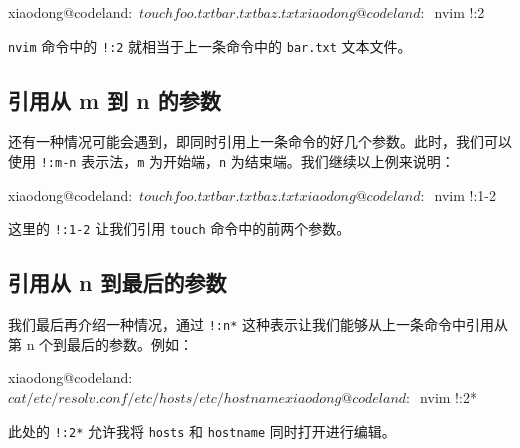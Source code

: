 \documentclass[]{ctexbook}
\newenvironment{Shaded}{\begin{snugshade}}{\end{snugshade}}
\newcommand{\ExtensionTok}[1]{#1}
\newcommand{\NormalTok}[1]{#1}
\begin{document}
\begin{Shaded}
\begin{Highlighting}[]
\ExtensionTok{xiaodong@codeland}\NormalTok{:~$ touch foo.txt bar.txt baz.txt}
\ExtensionTok{xiaodong@codeland}\NormalTok{:~$ nvim !:2}
\end{Highlighting}
\end{Shaded}

\texttt{nvim} 命令中的 \texttt{!:2} 就相当于上一条命令中的 \texttt{bar.txt} 文本文件。

\hypertarget{ux5f15ux7528ux4ece-m-ux5230-n-ux7684ux53c2ux6570}{%
\subsection{引用从 m 到 n 的参数}\label{ux5f15ux7528ux4ece-m-ux5230-n-ux7684ux53c2ux6570}}

还有一种情况可能会遇到，即同时引用上一条命令的好几个参数。此时，我们可以使用 \texttt{!:m-n} 表示法，\texttt{m} 为开始端，\texttt{n} 为结束端。我们继续以上例来说明：

\begin{Shaded}
\begin{Highlighting}[]
\ExtensionTok{xiaodong@codeland}\NormalTok{:~$ touch foo.txt bar.txt baz.txt}
\ExtensionTok{xiaodong@codeland}\NormalTok{:~$ nvim !:1-2}
\end{Highlighting}
\end{Shaded}

这里的 \texttt{!:1-2} 让我们引用 \texttt{touch} 命令中的前两个参数。

\hypertarget{ux5f15ux7528ux4ece-n-ux5230ux6700ux540eux7684ux53c2ux6570}{%
\subsection{引用从 n 到最后的参数}\label{ux5f15ux7528ux4ece-n-ux5230ux6700ux540eux7684ux53c2ux6570}}

我们最后再介绍一种情况，通过 \texttt{!:n*} 这种表示让我们能够从上一条命令中引用从第 n 个到最后的参数。例如：

\begin{Shaded}
\begin{Highlighting}[]
\ExtensionTok{xiaodong@codeland}\NormalTok{:~$ cat /etc/resolv.conf /etc/hosts /etc/hostname}
\ExtensionTok{xiaodong@codeland}\NormalTok{:~$ nvim !:2*}
\end{Highlighting}
\end{Shaded}

此处的 \texttt{!:2*} 允许我将 \texttt{hosts} 和 \texttt{hostname} 同时打开进行编辑。
\end{document}
